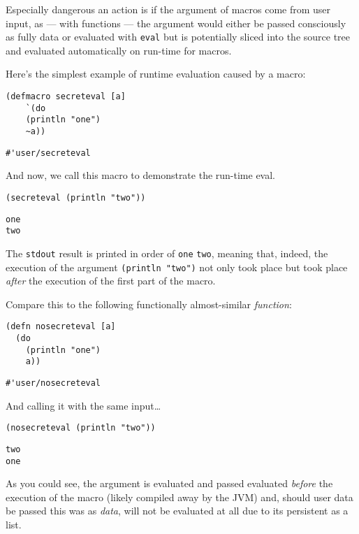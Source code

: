\documentclass[letterpaper]{article}
\begin{document}
Especially dangerous an action is if the argument of macros come from user input, as --- with functions --- the argument would either be passed consciously as fully data or evaluated with \texttt{eval} but is potentially sliced into the source tree and evaluated automatically on run-time for macros.

Here's the simplest example of runtime evaluation caused by a macro:

\begin{verbatim}
(defmacro secreteval [a]
    `(do
	(println "one")
	~a))
\end{verbatim}

\begin{verbatim}
#'user/secreteval
\end{verbatim}


And now, we call this macro to demonstrate the run-time eval.

\begin{verbatim}
(secreteval (println "two"))
\end{verbatim}

\begin{verbatim}
one
two
\end{verbatim}


The \texttt{stdout} result is printed in order of \texttt{one} \texttt{two}, meaning that, indeed, the execution of the argument \texttt{(println "two")} not only took place but took place \emph{after} the execution of the first part of the macro.

Compare this to the following functionally almost-similar \emph{function}:

\begin{verbatim}
(defn nosecreteval [a]
  (do
    (println "one")
    a))
\end{verbatim}

\begin{verbatim}
#'user/nosecreteval
\end{verbatim}


And calling it with the same input\ldots{}

\begin{verbatim}
(nosecreteval (println "two"))
\end{verbatim}

\begin{verbatim}
two
one
\end{verbatim}


As you could see, the argument is evaluated and passed evaluated \emph{before} the execution of the macro (likely compiled away by the JVM) and, should user data be passed this was as \emph{data}, will not be evaluated at all due to its persistent as a list.
\end{document}
